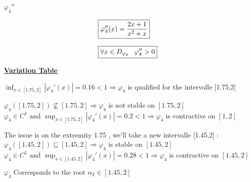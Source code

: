 \vspace{0.5cm}
\textbf{\underline{\(\varphi_4''\)}}
\begin{center}
    \begin{align*}
   &\boxed{\varphi_4''(x) =  \dfrac{2x+1}{x^{2}+x}}\\[0.25cm]
   &\boxed{\forall x \in D_{\varphi_4} \hspace{0.3cm} \varphi_4'' > 0}
    \end{align*}
\end{center}

\newpage
\textbf{\underline{Variation Table}}

\begin{center}
\end{center}
\vspace{0.25cm}

\vspace{0.25cm}

\(\displaystyle\inf_{x \in [1.75,2]} |\varphi_4'(x)| = 0.16 < 1 \Longrightarrow \varphi_4\) is qualified 
for the intervalle [1.75,2]

\vspace{0.5cm}
\(\varphi_4([1.75,2]) \nsubseteq [1.75,2] \Longrightarrow \varphi_4\) is not stable on \([1.75,2]\)\\[0.1cm]
\( \varphi_4 \in C^{1} \text{ and } \displaystyle\sup_{x \in [1.75, 2]} |\varphi_4'(x)| = 0.2 < 1 \Longrightarrow \varphi_4\) is contractive on \([1,2]\)

\vspace{0.5cm}
The issue is on the extremity 1.75 , we'll take a new intervalle [1.45,2] :\\[0.15cm]
\(\varphi_4([1.45,2]) \subseteq [1.45,2] \Longrightarrow \varphi_4\) is stable on \([1.45,2]\)\\[0.1cm]
\( \varphi_4 \in C^{1} \text{ and } \displaystyle\sup_{x \in [1.45, 2]} |\varphi_4'(x)| = 0.28 < 1 \Longrightarrow \varphi_4\) is contractive on \([1.45,2]\)


\begin{center}
    \(\boxed{\varphi_4 \text{ Corresponds to the root } \alpha_2 \in [1.45,2]}\)
\end{center}

